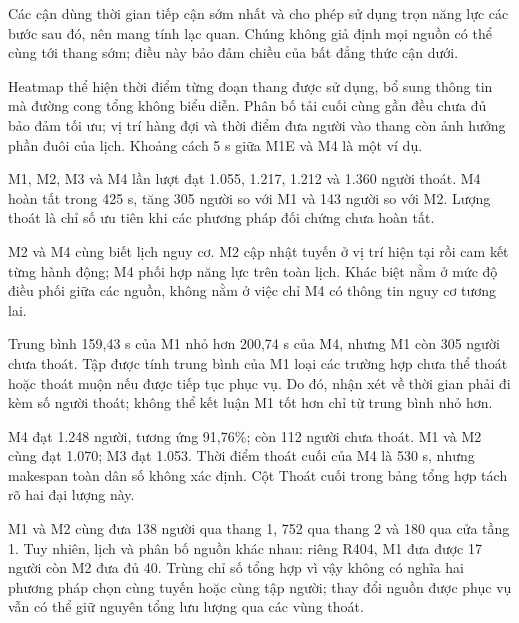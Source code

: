 Các cận dùng thời gian tiếp cận sớm nhất và cho phép sử dụng trọn năng lực các bước sau đó, nên mang tính lạc quan. Chúng không giả định mọi nguồn có thể cùng tới thang sớm; điều này bảo đảm chiều của bất đẳng thức cận dưới.

Heatmap thể hiện thời điểm từng đoạn thang được sử dụng, bổ sung thông tin mà đường cong tổng không biểu diễn. Phân bố tải cuối cùng gần đều chưa đủ bảo đảm tối ưu; vị trí hàng đợi và thời điểm đưa người vào thang còn ảnh hưởng phần đuôi của lịch. Khoảng cách 5 s giữa M1E và M4 là một ví dụ.

M1, M2, M3 và M4 lần lượt đạt 1.055, 1.217, 1.212 và 1.360 người thoát. M4 hoàn tất trong 425 s, tăng 305 người so với M1 và 143 người so với M2. Lượng thoát là chỉ số ưu tiên khi các phương pháp đối chứng chưa hoàn tất.

M2 và M4 cùng biết lịch nguy cơ. M2 cập nhật tuyến ở vị trí hiện tại rồi cam kết từng hành động; M4 phối hợp năng lực trên toàn lịch. Khác biệt nằm ở mức độ điều phối giữa các nguồn, không nằm ở việc chỉ M4 có thông tin nguy cơ tương lai.

Trung bình 159,43 s của M1 nhỏ hơn 200,74 s của M4, nhưng M1 còn 305 người chưa thoát. Tập được tính trung bình của M1 loại các trường hợp chưa thể thoát hoặc thoát muộn nếu được tiếp tục phục vụ. Do đó, nhận xét về thời gian phải đi kèm số người thoát; không thể kết luận M1 tốt hơn chỉ từ trung bình nhỏ hơn.

M4 đạt 1.248 người, tương ứng 91,76\%; còn 112 người chưa thoát. M1 và M2 cùng đạt 1.070; M3 đạt 1.053. Thời điểm thoát cuối của M4 là 530 s, nhưng makespan toàn dân số không xác định. Cột Thoát cuối trong bảng tổng hợp tách rõ hai đại lượng này.

M1 và M2 cùng đưa 138 người qua thang 1, 752 qua thang 2 và 180 qua cửa tầng 1. Tuy nhiên, lịch và phân bố nguồn khác nhau: riêng R404, M1 đưa được 17 người còn M2 đưa đủ 40. Trùng chỉ số tổng hợp vì vậy không có nghĩa hai phương pháp chọn cùng tuyến hoặc cùng tập người; thay đổi nguồn được phục vụ vẫn có thể giữ nguyên tổng lưu lượng qua các vùng thoát.

